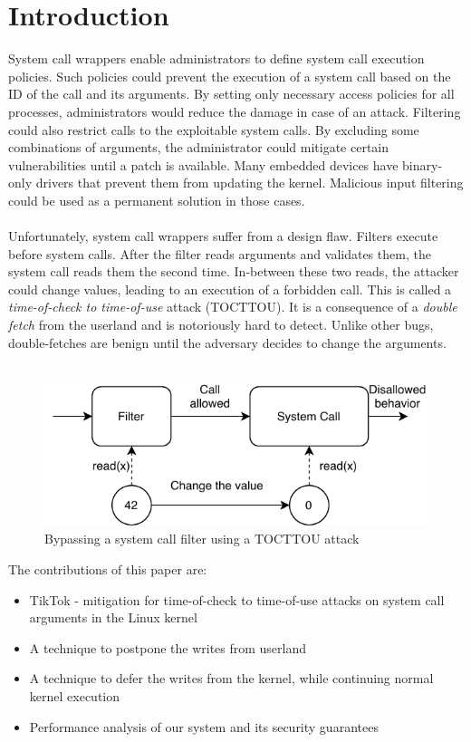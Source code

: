 \section{Introduction}
System call wrappers enable administrators to define system call execution
policies. Such policies could prevent the execution of a system call based 
on the ID of the call and its arguments. By setting only necessary access
policies for all processes, administrators would reduce the damage in case 
of an attack. Filtering could also restrict calls to the exploitable system
calls. By excluding some combinations of arguments, the administrator could 
mitigate certain vulnerabilities until a patch is available. Many embedded 
devices have binary-only drivers that prevent them from updating the 
kernel. Malicious input filtering could be used as a permanent solution in 
those cases.
\\
\\
Unfortunately, system call wrappers suffer from a design flaw. Filters execute 
before system calls. After the filter reads arguments and validates them, the
system call reads them the second time. In-between these two reads, the attacker
could change values, leading to an execution of a forbidden call. This is called
a \emph{time-of-check to time-of-use} attack (TOCTTOU). It is a consequence of a
\emph{double fetch} from the userland and is notoriously hard to detect. Unlike 
other bugs, double-fetches are benign until the adversary decides to change the 
arguments.
\\
\\
\begin{figure}[]
  \centering
  \includegraphics[width=.85\linewidth]{img/tocttou.pdf}
  \caption{Bypassing a system call filter using a TOCTTOU attack}
  \label{fig:tocttou}
\end{figure}

The contributions of this paper are:
\begin{itemize}
\item TikTok - mitigation for time-of-check to time-of-use attacks on system 
      call arguments in the Linux kernel
\item A technique to postpone the writes from userland
\item A technique to defer the writes from the kernel, while continuing normal
      kernel execution
\item Performance analysis of our system and its security guarantees
\end{itemize}

